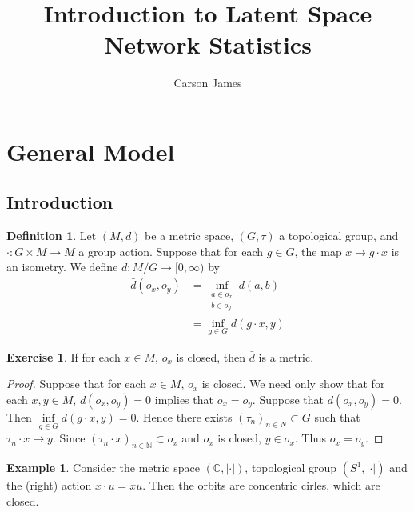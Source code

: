 \documentclass[12pt]{amsart}
\theoremstyle{definition}
\newtheorem{defn}[definition]{Definition}
\newtheorem{ex}[definition]{Exercise}
\newtheorem{exm}[definition]{Example}
\newcommand{\C}{\mathbb{C}}
\newcommand{\N}{\mathbb{N}}
\newcommand{\Rg}{[0,\infty)}
\begin{document}
	
	\title{Introduction to Latent Space Network Statistics}
	\author{Carson James}
	\maketitle
	
	\tableofcontents
	
	\section{General Model}
	\subsection{Introduction}
	\begin{defn}
	Let $(M, d)$ be a metric space, $(G, \tau)$ a topological group, and $\cdot: G \times M \rightarrow M$ a group action.  
	Suppose that for each $g \in G$, the map $x \mapsto g \cdot x$ is an isometry. We define 
	$\bar{d}: M / G \rightarrow \Rg$ by 
	\begin{align*}
	\bar{d}(o_x, o_y) 
	&= \inf_{\substack{a \in o_x \\ b \in o_y}} d(a,b) \\
	&= \inf_{g \in G} d(g \cdot x, y)
	\end{align*}
	
	\end{defn}
	
	
	
	\begin{ex}
	If for each $x \in M$, $o_x$ is closed, then $\bar{d}$ is a metric.
	\end{ex}
	
	\begin{proof}
	Suppose that for each $x \in M$, $o_x$ is closed. We need only show that for each $x,y \in M$, $\bar{d}(o_x , o_y) = 0$ implies that $o_x = o_y$. Suppose that $\bar{d}(o_x , o_y) = 0$. Then $\inf\limits_{ g \in G} d(g \cdot x, y) = 0$. Hence there exists $(\tau_n)_{n \in N} \subset G$ such that $\tau_n \cdot x \rightarrow y$. Since $(\tau_n \cdot x)_{n \in \N} \subset o_x$ and $o_x$ is closed, $y \in o_x$. Thus $o_x = o_y$. 
	\end{proof}
	
	\begin{exm}
	Consider the metric space $(\C, | \cdot |)$, topological group $(S^1, | \cdot |)$ and  the (right) action $x \cdot u = xu$. Then the orbits are concentric cirles, which are closed. 
	\end{exm}
	
\end{document}
